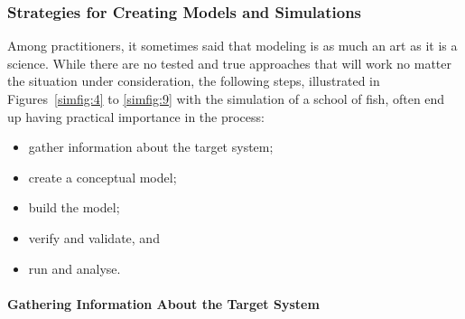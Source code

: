 \subsubsection{Strategies for Creating Models and Simulations}
Among practitioners, it sometimes said that modeling is as much an art as it is a science. While there are no tested and true approaches that will work no matter the situation under consideration, the following steps, illustrated in Figures~\ref{simfig:4} to \ref{simfig:9} with the simulation of a school of fish, often end up having practical importance in the process: 
\begin{itemize}[noitemsep]
\item gather information about the target system;
\item create a conceptual model; 
\item build the model; 
\item verify and validate, and
\item run and analyse. 
\end{itemize}
\paragraph{Gathering Information About the Target System}

